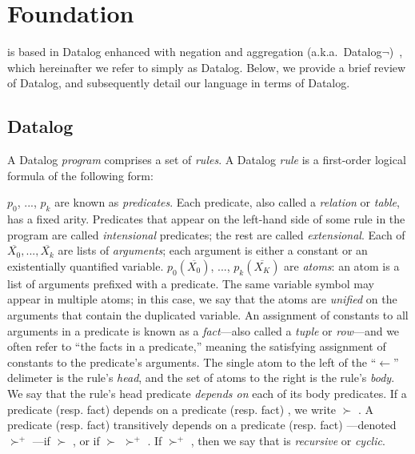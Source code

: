 \section{Foundation}
\label{sec:lang}

\lang is based in Datalog enhanced with negation and aggregation
(a.k.a.\ Datalog$\lnot$)~\cite{ullmanbook}, which hereinafter we refer to simply as Datalog.
Below, we provide a brief review of Datalog, and subsequently detail our
language in terms of Datalog.

\subsection{Datalog}
\label{sec:datalog}

A Datalog {\em program} comprises a set of {\em rules}.  A Datalog {\em rule}
is a first-order logical formula of the following form:


$p_0$, ..., $p_k$ are known as {\em
predicates}.  Each predicate, also called a {\em relation} or {\em table}, has
a fixed arity.  Predicates that appear on the left-hand side of some rule in
the program are called {\em intensional} predicates; the rest are called {\em
extensional}.  Each of $\overline{X_0}, ..., \overline{X_k}$ are lists of
\emph{arguments}; each argument is either a constant or an existentially quantified variable.
$p_0(\overline{X_0})$, ..., $p_k(\overline{X_K})$ are {\em atoms}: an atom is
a list of arguments prefixed with a predicate.  The same variable symbol may
appear in multiple atoms; in this case, we say that the atoms are {\em
unified} on the arguments that contain the duplicated variable.  An assignment of constants to all arguments in a predicate is known as a {\em
fact}---also called a {\em tuple} or {\em row}---and we often refer to ``the
facts in a predicate,'' meaning the satisfying assignment of constants to the
predicate's arguments.  The single
atom to the left of the ``$\leftarrow$'' delimeter is the rule's {\em head}, and
the set of atoms to the right is the rule's {\em body}.  We say that the rule's
head predicate {\em depends on} each of its body predicates.   If a predicate
(resp. fact)  depends on a predicate (resp. fact) , we
write  $\succ$ .  A predicate (resp. fact)  transitively depends on a predicate (resp. fact) ---denoted
 $\succ^+$ ---if  $\succ$ , or if
 $\succ$  $\succ^+$ .  If 
$\succ^+$ , then we say that  is {\em recursive} or {\em
cyclic}.

